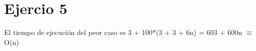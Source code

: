 \documentclass{article}
\begin{document}
\section*{Ejercio 5}

El tiempo de ejecución del peor caso es 3 + 100*(3 + 3 + 6n) = 603 + 600n $\equiv$ O(n)
\end{document}
